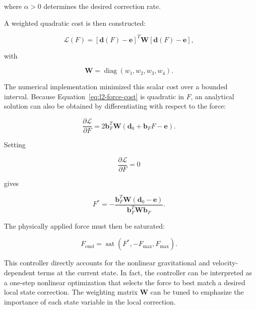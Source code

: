 where $\alpha>0$ determines the desired correction rate.

A weighted quadratic cost is then constructed:

\begin{equation}
\mathcal{L}(F)
=
\left[
\mathbf{d}(F)-\mathbf{e}
\right]^{T}
\mathbf{W}
\left[
\mathbf{d}(F)-\mathbf{e}
\right],
\label{eq:l2-force-cost}
\end{equation}

with

\begin{equation}
\mathbf{W}
=
\operatorname{diag}
\left(
w_1,w_2,w_3,w_4
\right).
\end{equation}

The numerical implementation minimized this scalar cost over a bounded interval. Because Equation~\eqref{eq:l2-force-cost} is quadratic in $F$, an analytical solution can also be obtained by differentiating with respect to the force:

\begin{equation}
\frac{\partial\mathcal{L}}{\partial F}
=
2\mathbf{b}_F^{T}\mathbf{W}
\left(
\mathbf{d}_0+\mathbf{b}_FF-\mathbf{e}
\right).
\label{eq:l2-force-derivative}
\end{equation}

Setting

\begin{equation}
\frac{\partial\mathcal{L}}{\partial F}=0
\end{equation}

gives

\begin{equation}
F^{*}
=
-
\frac{
\mathbf{b}_F^{T}\mathbf{W}
\left(
\mathbf{d}_0-\mathbf{e}
\right)
}{
\mathbf{b}_F^{T}\mathbf{W}\mathbf{b}_F
}.
\label{eq:l2-optimal-force}
\end{equation}

The physically applied force must then be saturated:

\begin{equation}
F_{\mathrm{cmd}}
=
\operatorname{sat}
\left(
F^{*},
-F_{\max},
F_{\max}
\right).
\label{eq:l2-saturated-force}
\end{equation}

This controller directly accounts for the nonlinear gravitational and velocity-dependent terms at the current state. In fact, the controller can be interpreted as a one-step nonlinear optimization that selects the force to best match a desired local state correction. The weighting matrix $\mathbf{W}$ can be tuned to emphasize the importance of each state variable in the local correction.

